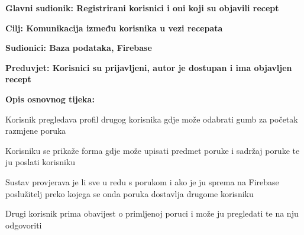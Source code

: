 				
				\noindent {}
				\begin{packed_item}
					
					\item \textbf{Glavni sudionik: Registrirani korisnici i oni koji su objavili recept }
					\item  \textbf{Cilj: Komunikacija između korisnika u vezi recepata} 
					\item  \textbf{Sudionici: Baza podataka, Firebase} 
					\item  \textbf{Preduvjet: Korisnici su prijavljeni, autor je dostupan i ima objavljen recept} 
					\item  \textbf{Opis osnovnog tijeka:}
					
					\item[] \begin{packed_enum}
						
						\item Korisnik pregledava profil drugog korisnika gdje može odabrati gumb za početak razmjene poruka
						\item Korisniku se prikaže forma gdje može upisati predmet poruke i sadržaj poruke te ju poslati korisniku
						\item Sustav provjerava je li sve u redu s porukom i ako je ju sprema na Firebase poslužitelj preko kojega se onda poruka dostavlja drugome korisniku
						\item Drugi korisnik prima obavijest o primljenoj poruci i može ju pregledati te na nju odgovoriti
					\end{packed_enum}
				
				\end{packed_item}
				
